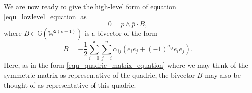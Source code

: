 \documentclass{ecgd-l}
\theoremstyle{definition}
\theoremstyle{remark}
\numberwithin{equation}{section}
\newcommand{\G}{\mathbb{G}}
\newcommand{\W}{\mathbb{W}}
\begin{document}
We are now ready to give the high-level form of equation \eqref{equ_lowlevel_equation} as
\begin{equation}
0 = p\wedge\bar{p}\cdot B,
\end{equation}
where $B\in\G(\W^{2(n+1)})$ is a bivector of the form
\begin{equation}
B = -\frac{1}{2}\sum_{i=0}^n\sum_{j=i}^n\alpha_{ij}(e_i\bar{e}_j+(-1)^{\sigma_{ij}}\bar{e}_ie_j).
\end{equation}
Here, as in the form \eqref{equ_quadric_matrix_equation} where we may think of
the symmetric matrix as representative of the quadric, the bivector $B$ may also be thought
of as representative of this quadric.




\end{document}
